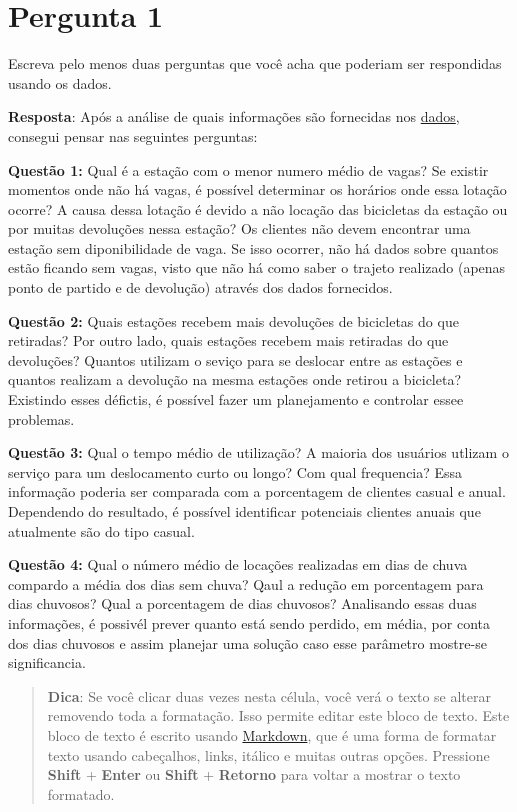 \documentclass[11pt]{article}
\begin{document}
    \section{Pergunta 1}\label{pergunta-1}

Escreva pelo menos duas perguntas que você acha que poderiam ser
respondidas usando os dados.

    \textbf{Resposta}: Após a análise de quais informações são fornecidas
nos \href{http://www.bayareabikeshare.com/open-data}{dados}, consegui
pensar nas seguintes perguntas:

\textbf{Questão 1:} Qual é a estação com o menor numero médio de vagas?
Se existir momentos onde não há vagas, é possível determinar os horários
onde essa lotação ocorre? A causa dessa lotação é devido a não locação
das bicicletas da estação ou por muitas devoluções nessa estação? Os
clientes não devem encontrar uma estação sem diponibilidade de vaga. Se
isso ocorrer, não há dados sobre quantos estão ficando sem vagas, visto
que não há como saber o trajeto realizado (apenas ponto de partido e de
devolução) através dos dados fornecidos.

\textbf{Questão 2:} Quais estações recebem mais devoluções de bicicletas
do que retiradas? Por outro lado, quais estações recebem mais retiradas
do que devoluções? Quantos utilizam o seviço para se deslocar entre as
estações e quantos realizam a devolução na mesma estações onde retirou a
bicicleta? Existindo esses défictis, é possível fazer um planejamento e
controlar essee problemas.

\textbf{Questão 3:} Qual o tempo médio de utilização? A maioria dos
usuários utlizam o serviço para um deslocamento curto ou longo? Com qual
frequencia? Essa informação poderia ser comparada com a porcentagem de
clientes casual e anual. Dependendo do resultado, é possível identificar
potenciais clientes anuais que atualmente são do tipo casual.

\textbf{Questão 4:} Qual o número médio de locações realizadas em dias
de chuva compardo a média dos dias sem chuva? Qaul a redução em
porcentagem para dias chuvosos? Qual a porcentagem de dias chuvosos?
Analisando essas duas informações, é possivél prever quanto está sendo
perdido, em média, por conta dos dias chuvosos e assim planejar uma
solução caso esse parâmetro mostre-se significancia.

\begin{quote}
\textbf{Dica}: Se você clicar duas vezes nesta célula, você verá o texto
se alterar removendo toda a formatação. Isso permite editar este bloco
de texto. Este bloco de texto é escrito usando
\href{http://daringfireball.net/projects/markdown/syntax}{Markdown}, que
é uma forma de formatar texto usando cabeçalhos, links, itálico e muitas
outras opções. Pressione \textbf{Shift} + \textbf{Enter} ou
\textbf{Shift} + \textbf{Retorno} para voltar a mostrar o texto
formatado.
\end{quote}
\end{document}

